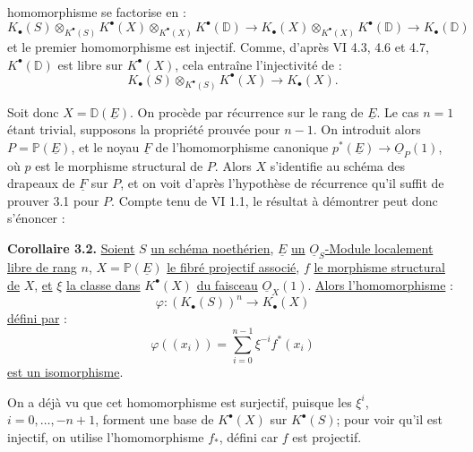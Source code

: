 
homomorphisme se factorise en :
\[
K_\bullet(S)\otimes_{K^{\bullet}(S)}K^{\bullet}(X)\otimes_{K^{\bullet}(X)}K^{\bullet}(\mathbb D)
\longrightarrow K_\bullet(X)\otimes_{K^{\bullet}(X)}K^{\bullet}(\mathbb D)
\longrightarrow K_\bullet(\mathbb D)
\]
et le premier homomorphisme est injectif. Comme, d'après VI 4.3, 4.6 et 4.7, $K^{\bullet}(\mathbb D)$ est libre sur $K^{\bullet}(X)$, cela entraîne l'injectivité de :
\[
K_\bullet(S)\otimes_{K^{\bullet}(S)}K^{\bullet}(X)\to K_\bullet(X).
\]

Soit donc $X=\mathbb D(\underline{E})$. On procède par récurrence sur le rang de $\underline{E}$. Le cas $n=1$ étant trivial, supposons la propriété prouvée pour $n-1$. On introduit alors $P=\mathbb P(\underline{E})$, et le noyau $\underline{F}$ de l'homomorphisme canonique $p^*(\underline{E})\to \underline{O}_P(1)$, où $p$ est le morphisme structural de $P$. Alors $X$ s'identifie au schéma des drapeaux de $\underline{F}$ sur $P$, et on voit d'après l'hypothèse de récurrence qu'il suffit de prouver 3.1 pour $P$. Compte tenu de VI 1.1, le résultat à démontrer peut donc s'énoncer :

\textbf{Corollaire 3.2.} \uline{Soient} $S$ \uline{un schéma noethérien}, $\underline{E}$ \uline{un} $\underline{O}_S$\uline{-Module localement libre de rang} $n$, $X=\mathbb P(\underline{E})$ \uline{le fibré projectif associé}, $f$ \uline{le morphisme structural de} $X$, \uline{et} $\xi$ \uline{la classe dans} $K^{\bullet}(X)$ \uline{du faisceau} $\underline{O}_X(1)$. \uline{Alors l'homomorphisme} :
\[
\varphi:(K_\bullet(S))^n\longrightarrow K_\bullet(X)
\]
\uline{défini par} :
\[
\varphi((x_i))=\sum_{i=0}^{n-1}\xi^{-i}f^*(x_i)
\]
\uline{est un isomorphisme}.

On a déjà vu que cet homomorphisme est surjectif, puisque les $\xi^i$, $i=0,\ldots,-n+1$, forment une base de $K^{\bullet}(X)$ sur $K^{\bullet}(S)$; pour voir qu'il est injectif, on utilise l'homomorphisme $f_*$, défini car $f$ est projectif.
